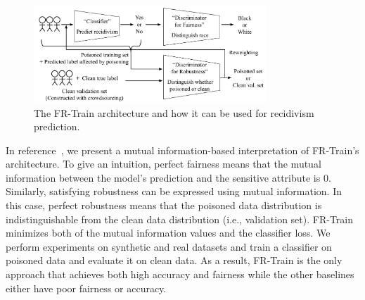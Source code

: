 \documentclass[11pt]{article}
\newcommand{\frtrain}{FR-Train}
\newtheorem{thm}{Theorem}
\begin{document}
\begin{figure}[t]
  \centering
  \includegraphics[width=0.78\textwidth]{submissions/responsible-ai/figs/frtrain.pdf}
  \caption{The \frtrain{} architecture and how it can be used for recidivism prediction.}
  \label{fig:frtrain}
\end{figure}

 

\newpage
In reference~\cite{DBLP:conf/icml/RohLWS20}, we present a mutual information-based interpretation of \frtrain{}'s architecture. To give an intuition, perfect fairness means that the mutual information between the model's prediction and the sensitive attribute is 0. Similarly, satisfying robustness can be expressed using mutual information. In this case, perfect robustness means that the poisoned data distribution is indistinguishable from the clean data distribution (i.e., validation set). \frtrain{} minimizes both of the mutual information values and the classifier loss. We perform experiments on synthetic and real datasets and train a classifier on poisoned data and evaluate it on clean data. As a result, \frtrain{} is the only approach that achieves both high accuracy and fairness while the other baselines either have poor fairness or accuracy.
\end{document}
